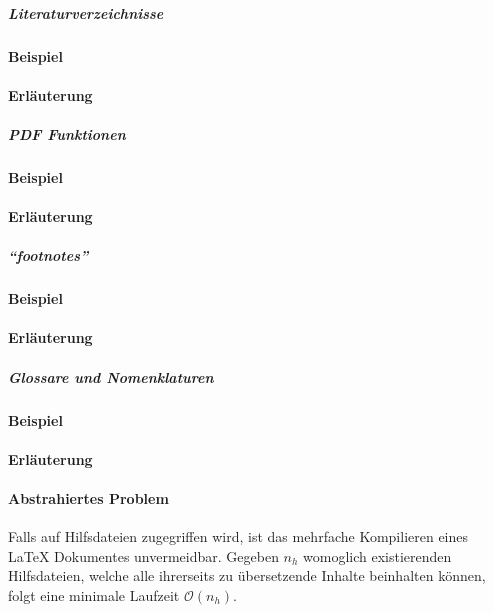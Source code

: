 \subparagraph*{Literaturverzeichnisse}
\paragraph*{Beispiel}
\paragraph*{Erläuterung}

\subparagraph*{PDF Funktionen}
\paragraph*{Beispiel}
\paragraph*{Erläuterung}

\subparagraph*{\enquote{footnotes}}
\paragraph*{Beispiel}
\paragraph*{Erläuterung}




\subparagraph*{Glossare und Nomenklaturen}
\paragraph*{Beispiel}
\paragraph*{Erläuterung}

\paragraph{Abstrahiertes Problem}
Falls auf Hilfsdateien zugegriffen wird, ist das mehrfache Kompilieren eines \LaTeX{} Dokumentes unvermeidbar. Gegeben $n_{h}$ womoglich existierenden Hilfsdateien, welche alle ihrerseits zu übersetzende Inhalte beinhalten können, folgt eine minimale Laufzeit $\mathcal{O}(n_h)$. 


